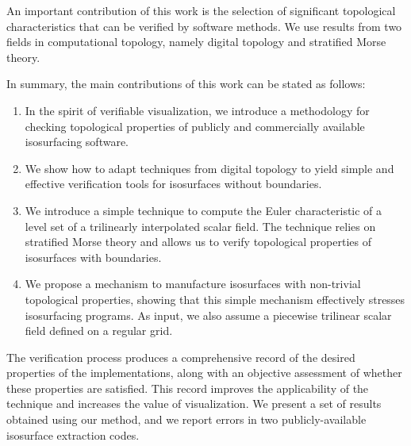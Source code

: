 %
An important contribution of this work is the selection of
significant topological characteristics that can be verified by
software methods.
%
We use results from two fields in computational topology, namely
digital topology and stratified Morse theory.
%

In summary, the main contributions of this work can be stated as
follows:
\begin{enumerate}
\item In the spirit of verifiable visualization, we introduce a
  methodology for checking topological properties of publicly and
  commercially available isosurfacing software.
\item We show how to adapt techniques from digital topology to yield simple
  and effective verification tools for isosurfaces without
  boundaries.
\item We introduce a simple technique to compute the Euler
  characteristic of a level set of a trilinearly interpolated scalar
  field. The technique relies on stratified Morse theory and allows
  us to verify topological properties of isosurfaces with boundaries.
\item We propose a mechanism to manufacture isosurfaces with
  non-trivial topological properties, showing that this simple
  mechanism effectively stresses isosurfacing programs. As input, we
  also assume a piecewise trilinear scalar field defined on a regular
  grid.
%
%
\end{enumerate}
The verification process produces a comprehensive record of the desired properties
of the implementations, along with an objective assessment of whether these
properties are satisfied. This record improves the
applicability of the technique and increases the value of
visualization.
%
%
%
We present a set of results obtained using our method, and we report
errors in two publicly-available isosurface extraction codes.

